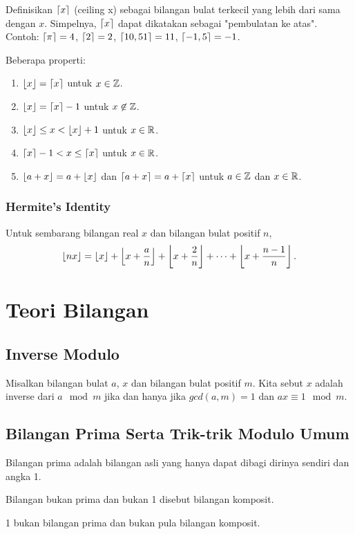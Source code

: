 \documentclass[11pt]{scrartcl}
\begin{document}
    Definisikan $\left\lceil x \right\rceil$ (ceiling x) sebagai bilangan bulat terkecil yang lebih dari sama dengan $x$. Simpelnya, $\left\lceil x \right\rceil$ dapat dikatakan sebagai "pembulatan ke atas". Contoh: $\left\lceil \pi \right\rceil=4$, $\left\lceil 2 \right\rceil=2$, $\left\lceil 10,51 \right\rceil=11$, $\left\lceil -1,5 \right\rceil=-1$.
    
    Beberapa properti:
    \begin{enumerate}
        \item $\left\lfloor x \right\rfloor=\left\lceil x \right\rceil$ untuk $x \in \mathbb Z$.
        \item $\left\lfloor x \right\rfloor=\left\lceil x \right\rceil-1$ untuk $x \not \in \mathbb Z$.
        \item $\left\lfloor x \right\rfloor \le  x < \left\lfloor x \right\rfloor+1$ untuk $x \in \mathbb R$.
        \item $\left\lceil x \right\rceil-1 < x \le \left\lceil x \right\rceil$ untuk $x \in \mathbb R$.
        \item $\left\lfloor a+x \right\rfloor=a+\left\lfloor x \right\rfloor$ dan $\left\lceil a+x \right\rceil=a+\left\lceil x \right\rceil$ untuk $a\in \mathbb Z$ dan $x \in \mathbb R$.
    \end{enumerate}
    
    \subsubsection{Hermite's Identity}
    Untuk sembarang bilangan real $x$ dan bilangan bulat positif $n$,
    $$\left\lfloor nx \right\rfloor=\left\lfloor x \right\rfloor+\left\lfloor x+\dfrac{a}{n} \right\rfloor+\left\lfloor x+\dfrac{2}{n} \right\rfloor+\dots+\left\lfloor x+\dfrac{n-1}{n} \right\rfloor.$$

    
    \section{Teori Bilangan}
    \subsection{Inverse Modulo}
    Misalkan bilangan bulat $a$, $x$ dan bilangan bulat positif $m$. Kita sebut $x$ adalah inverse dari $a \mod m$ jika dan hanya jika $gcd(a,m)=1$ dan $ax \equiv 1 \mod m$.
    
    \subsection{Bilangan Prima Serta Trik-trik Modulo Umum}
    Bilangan prima adalah bilangan asli yang hanya dapat dibagi dirinya sendiri dan angka 1. 
    
    Bilangan bukan prima dan bukan 1 disebut bilangan komposit.
    
    1 bukan bilangan prima dan bukan pula bilangan komposit. 
    
\end{document}
